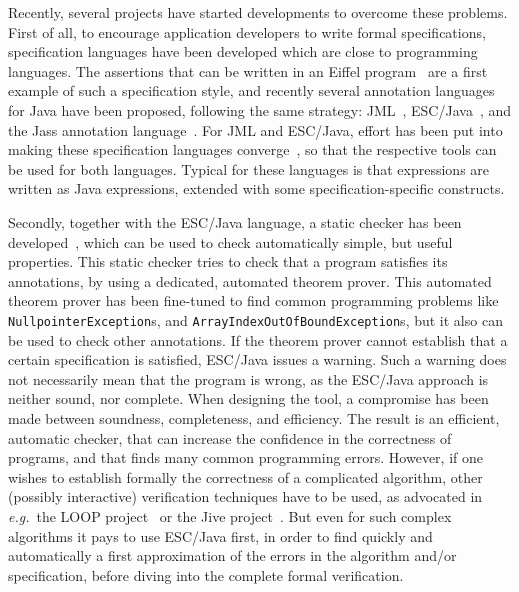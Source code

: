 \documentclass[a4paper]{llncs}
\begin{document}
Recently, several projects have started developments to overcome these
problems. First of all, to encourage application developers to write
formal specifications, specification languages have been developed
which are close to programming languages. The assertions that can be
written in an Eiffel program~\cite{Meyer97} are a first example of
such a specification style, and recently several annotation
languages for Java have been proposed, following the same strategy:
JML~\cite{LeavensBR99}, ESC/Java~\cite{ESCJavaUrl}, and the Jass
annotation language~\cite{JassUrl}. For JML and ESC/Java, effort has
been put into making these specification languages
converge~\cite{EscJmlDiff}, so that the respective tools can be used
for both languages. Typical for these languages is that expressions
are written as Java expressions, extended with some
specification-specific constructs.

Secondly, together with the ESC/Java language, a static checker has
been developed~\cite{ESCJavaUrl}, which can be used to check
automatically simple, but useful properties. This static checker tries
to check that a program satisfies its annotations, by using a
dedicated, automated theorem prover. This automated theorem prover has
been fine-tuned to find common programming problems like
\texttt{Null\-pointer\-Exception}s, and
\texttt{Array\-Index\-Out\-Of\-Bound\-Exception}s, but it also can be
used to check other annotations. If the theorem prover cannot
establish that a certain specification is satisfied, ESC/Java issues a
warning. Such a warning does not necessarily mean that the program is
wrong, as the ESC/Java approach is neither sound, nor complete. When
designing the tool, a compromise has been made between soundness,
completeness, and efficiency. The result is an efficient, automatic
checker, that can increase the confidence in the correctness of
programs, and that finds many common programming errors. However, if
one wishes to establish formally the correctness of a complicated
algorithm, other (possibly interactive) verification techniques have
to be used, as advocated in
\emph{e.g.}~the LOOP project~\cite{LOOPUrl} or the Jive
project~\cite{MeyerP00}. But even for such complex algorithms it pays
to use ESC/Java first, in order to find quickly and automatically a
first approximation of the errors in the algorithm and/or
specification, before diving into the complete formal verification.
\end{document}
